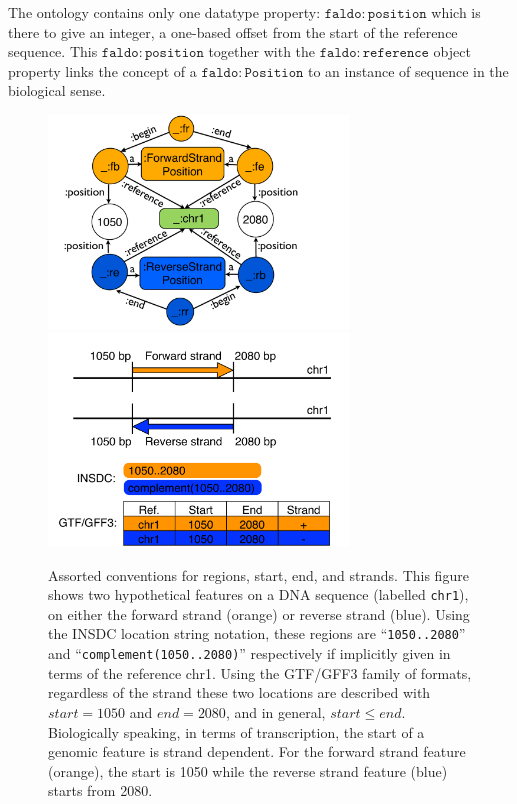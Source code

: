 The ontology contains only one datatype property: $\mathtt{faldo\colon{}position}$ which is there to give an integer,
a one-based offset from the start of the reference sequence.
This $\mathtt{faldo\colon{}position}$ together with the $\mathtt{faldo\colon{}reference}$ object property links the concept
of a $\mathtt{faldo\colon{}Position}$ to an instance of sequence in the biological sense.
\begin{figure}
\begin{center}
\includegraphics[width=8cm]{figures/figures3.pdf}
\includegraphics[width=8cm]{figures/figures.pdf}
\end{center}
\caption{Assorted conventions for regions, start, end, and strands.
This figure shows two hypothetical features on a DNA sequence
(labelled \texttt{chr1}), on either the forward strand (orange) or
reverse strand (blue).
Using the INSDC location string notation, these regions are
``\texttt{1050..2080}'' and ``\texttt{complement(1050..2080)}''
respectively if implicitly given in terms of the reference chr1.
Using the GTF/GFF3 family of formats, regardless of the
strand these two locations are described with $start = 1050$
and $end = 2080$, and in general, $start \leq end$.
Biologically speaking, in terms of transcription, the start of a genomic
feature is strand dependent.
For the forward strand feature (orange), the start is 1050
while the reverse strand feature (blue) starts from 2080.}
\label{fig:strands}
\end{figure}

